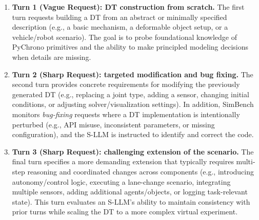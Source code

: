 \begin{enumerate}
    \item \textbf{Turn 1 (Vague Request): DT construction from scratch.}
    The first turn requests building a DT from an abstract or minimally specified description (e.g., a basic mechanism, a deformable object setup, or a vehicle/robot scenario). The goal is to probe foundational knowledge of PyChrono primitives and the ability to make principled modeling decisions when details are missing.

    \item \textbf{Turn 2 (Sharp Request): targeted modification and bug fixing.}
    The second turn provides concrete requirements for modifying the previously generated DT (e.g., replacing a joint type, adding a sensor, changing initial conditions, or adjusting solver/visualization settings). In addition, SimBench monitors \emph{bug-fixing} requests where a DT implementation is intentionally perturbed (e.g., API misuse, inconsistent parameters, or missing configuration), and the S-LLM is instructed to identify and correct the code.

    \item \textbf{Turn 3 (Sharp Request): challenging extension of the scenario.}
    The final turn specifies a more demanding extension that typically requires multi-step reasoning and coordinated changes across components (e.g., introducing autonomy/control logic, executing a lane-change scenario, integrating multiple sensors, adding additional agents/objects, or logging task-relevant state). This turn evaluates an S-LLM’s ability to maintain consistency with prior turns while scaling the DT to a more complex virtual experiment.
\end{enumerate}

